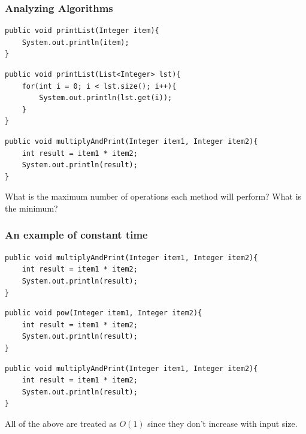 \documentclass{beamer}
\begin{document}
\begin{frame}[fragile]
    \frametitle{Analyzing Algorithms}
    \centering
    \begin{minipage}{0.45\textwidth}
        \begin{lstlisting}[frame=trBL, basicstyle=\tiny]
public void printList(Integer item){
    System.out.println(item);
}
        \end{lstlisting}
    \end{minipage}
    \hfill
    \begin{minipage}{0.49\textwidth}
        \begin{lstlisting}[frame=trBL, basicstyle=\tiny]
public void printList(List<Integer> lst){
    for(int i = 0; i < lst.size(); i++){
        System.out.println(lst.get(i));
    }
}
        \end{lstlisting}
    \end{minipage}
    \begin{lstlisting}[frame=trBL, basicstyle=\tiny]
public void multiplyAndPrint(Integer item1, Integer item2){
    int result = item1 * item2;
    System.out.println(result);
}
    \end{lstlisting}
    \vfill
    {\large What is the maximum number of operations each method will perform? What is the minimum?}
\end{frame}

\begin{frame}[fragile]
    \frametitle{An example of constant time}
    \begin{lstlisting}[frame=trBL, basicstyle=\tiny]
public void multiplyAndPrint(Integer item1, Integer item2){
    int result = item1 * item2;
    System.out.println(result);
}
    \end{lstlisting}
    \begin{lstlisting}[frame=trBL, basicstyle=\tiny]
public void pow(Integer item1, Integer item2){
    int result = item1 * item2;
    System.out.println(result);
}
    \end{lstlisting}
    \begin{lstlisting}[frame=trBL, basicstyle=\tiny]
public void multiplyAndPrint(Integer item1, Integer item2){
    int result = item1 * item2;
    System.out.println(result);
}
    \end{lstlisting}
    \vfill
    {\large All of the above are treated as $O(1)$ since they don't increase with input size.}
\end{frame}
\end{document}

